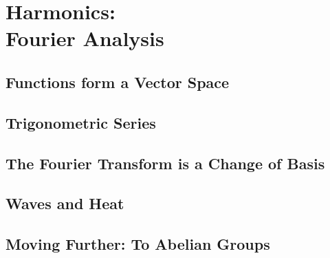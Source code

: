 \chapter[Harmonics: Fourier Analysis]{Harmonics:\\ Fourier Analysis}

\section{Functions form a Vector Space} %
\label{sec:functions_form_a_vector_space}


\section{Trigonometric Series} %
\label{sec:trigonometric_series}


\section{The Fourier Transform is a Change of Basis} %
\label{sec:the_fourier_transform_is_a_change_of_basis}


\section{Waves and Heat} %
\label{sec:waves_and_heat}


\section{Moving Further: To Abelian Groups} %
\label{sec:moving_further_to_abelian_groups}

